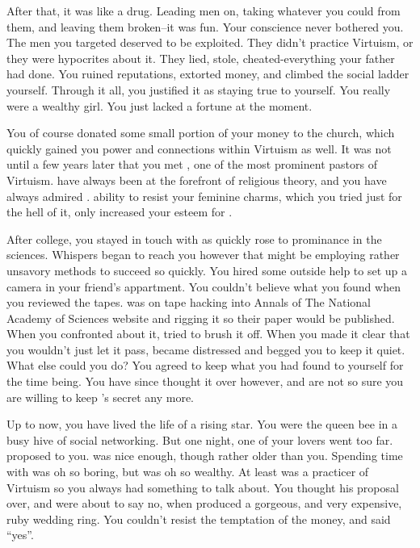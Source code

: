 \documentclass[char]{guildcamp1}
\begin{document}
After that, it was like a drug. Leading men on, taking whatever you could from them, and leaving them broken--it was fun. Your conscience never bothered you. The men you targeted deserved to be exploited. They didn't practice Virtuism, or they were hypocrites about it. They lied, stole, cheated-everything your father had done. You ruined reputations, extorted money, and climbed the social ladder yourself. Through it all, you justified it as staying true to yourself. You really were a wealthy girl. You just lacked a fortune at the moment.  

You of course donated some small portion of your money to the church, which quickly gained you power and connections within Virtuism as well. It was not until a few years later that you met \cPastor{}, one of the most prominent pastors of Virtuism. \cPastor{\They} have always been at the forefront of religious theory, and you have always admired \cPastor{\them}. \cPastor{\them} ability to resist your feminine charms, which you tried just for the hell of it, only increased your esteem for \cPastor{}. 

After college, you stayed in touch with \cRival{} as \cRival{\they} quickly rose to prominance in the sciences. Whispers began to reach you however that \cRival{} might be employing rather unsavory methods to succeed so quickly. You hired some outside help to set up a camera in your friend's appartment. You couldn't believe what you found when you reviewed the tapes. \cRival{} was on tape hacking into Annals of The National Academy of Sciences website and rigging it so their paper would be published. When you confronted \cRival{\them} about it, \cRival{\they} tried to brush it off. When you made it clear that you wouldn't just let it pass, \cRival{} became distressed and begged you to keep it quiet.  What else could you do? You agreed to keep what you had found to yourself for the time being. You have since thought it over however, and are not so sure you are willing to keep \cRival{}'s secret any more.


Up to now, you have lived the life of a rising star. You were the queen bee in a busy hive of social networking. But one night, one of your lovers went too far. \cGroomA{} proposed to you. \cGroomA{\They} was nice enough, though rather older than you. Spending time with \cGroomA{\them} was oh so boring, but \cGroomA{\they} was oh so wealthy. At least \cGroomA{\they} was  a practicer of Virtuism so you always had something to talk about. You thought his proposal over, and were about to say no, when \cGroomA{\they} produced a gorgeous, and very expensive, ruby wedding ring. You couldn't resist the temptation of the money, and said ``yes''.
\end{document}
